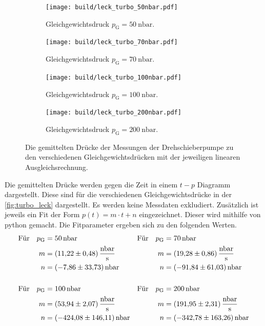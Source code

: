     \begin{figure}[h]
      \begin{subfigure}{0.48\textwidth}
        \centering
        \texttt{[image: build/leck\_turbo\_50nbar.pdf]}
        \caption{Gleichgewichtsdruck $p_\text{G} = \SI{50}{\nano\bar}$.}
        \label{fig:turbo_leck_50}
      \end{subfigure}
      \hfill
      \begin{subfigure}{0.48\textwidth}
        \centering
        \texttt{[image: build/leck\_turbo\_70nbar.pdf]}
        \caption{Gleichgewichtsdruck $p_\text{G} = \SI{70}{\nano\bar}$.}
        \label{fig:turbo_leck_70}
      \end{subfigure}
      \hfill
      \begin{subfigure}{0.48\textwidth}
        \centering
        \texttt{[image: build/leck\_turbo\_100nbar.pdf]}
        \caption{Gleichgewichtsdruck $p_\text{G} = \SI{100}{\nano\bar}$.}
        \label{fig:turbo_leck_100}
      \end{subfigure}
      \hfill
      \begin{subfigure}{0.48\textwidth}
        \centering
        \texttt{[image: build/leck\_turbo\_200nbar.pdf]}
        \caption{}Gleichgewichtsdruck $p_\text{G} = \SI{200}{\nano\bar}$.
        \label{fig:turbo_leck_200}
      \end{subfigure}
      \caption{Die gemittelten Drücke der Messungen  der Drehschieberpumpe zu den verschiedenen Gleichgewichtsdrücken mit der jeweiligen linearen Ausgleichsrechnung.}
      \label{fig:turbo_leck}
    \end{figure}

    \noindent Die gemittelten Drücke werden gegen die Zeit in einem $t-p$ Diagramm dargestellt. Diese sind für die verschiedenen Gleichgewichtsdrücke in der \autoref{fig:turbo_leck} dargestellt. 
    Es werden keine Messdaten exkludiert.  
    Zusätzlich ist jeweils ein Fit der Form $p(t) = m \cdot t + n $ eingezeichnet. Dieser wird mithilfe von python \cite{scipy} gemacht. Die Fitparameter ergeben sich zu den folgenden Werten. 
    \begin{align*}
      \text{Für} \quad  p_\text{G} &= \SI{50}{\nano\bar} & \text{Für} \quad  p_\text{G} &= \SI{70}{\nano\bar}\\
      m &= \SI{11.22 \pm 0.48}{\nano\bar\per\second} & m &= \SI{19.28 \pm 0.86}{\nano\bar\per\second} \\
      n &= \SI{-7.86 \pm 33.73}{\nano\bar} & n &= \SI{-91.84 \pm 61.03}{\nano\bar} \\
      \\
      \text{Für} \quad  p_\text{G} &= \SI{100}{\nano\bar} & \text{Für} \quad  p_\text{G} &= \SI{200}{\nano\bar}\\
      m &= \SI{53.94(207)}{\nano\bar\per\second} & m &= \SI{191.95 \pm 2.31}{\nano\bar\per\second} \\
      n &= \SI{-424.08 (14611)}{\nano\bar} & n &= \SI{-342.78 \pm 163.26}{\nano\bar} 
    \end{align*} 

